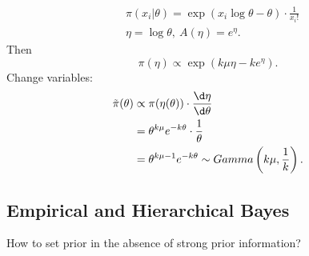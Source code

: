 \documentclass[a4paper]{article}
\begin{document}
\begin{eg}
\begin{enumerate}
\begin{equation*}
\begin{aligned}
				& \pi (x_i|\theta) = \exp(x_i \log\theta - \theta) \cdot \frac{1}{x_i!} \\
				& \eta = \log \theta, \ A(\eta) = e^\eta.
			\end{aligned}
		\end{equation*}
		Then
		\begin{equation*}
			\pi (\eta) \propto \exp(k \mu \eta - k e^\eta).
		\end{equation*}
		Change variables: 
		\begin{equation}
			\begin{aligned}
				\tilde{\pi}(\theta) & \propto \pi(\eta(\theta)) \cdot \frac{\d \eta}{\d \theta} \\
				&= \theta^{k\mu} e^{-k\theta} \cdot \frac{1}{\theta} \\
				&= \theta^{k\mu - 1} e^{-k\theta} \sim Gamma\left(k\mu,\frac{1}{k}\right).\\
			\end{aligned}
		\end{equation}
	\end{enumerate}
\end{eg}

\subsection{Empirical and Hierarchical Bayes}

\begin{question}
	How to set prior in the absence of strong prior information?
\end{question}
\end{document}
